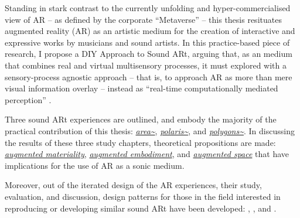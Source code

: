     \noindent Standing in stark contrast to the currently unfolding and hyper-commercialised view of AR --  as defined by the corporate ``Metaverse'' --  this thesis resituates augmented reality (AR) as an artistic medium for the creation of interactive and expressive works by musicians and sound artists. In this practice-based piece of research, I propose a DIY Approach to Sound ARt, arguing that, as an medium that combines real and virtual multisensory processes, it must explored with a sensory-process agnostic approach -- that is, to approach AR as more than mere visual information overlay -- instead as ``real-time computationally mediated perception'' \citep{chevalier2020}.
    
    \noindent Three sound ARt experiences are outlined, and embody the majority of the practical contribution of this thesis: \textit{\hyperref[sec: area]{area\textasciitilde{}}}, \textit{\hyperref[sec: polaris]{polaris\textasciitilde{}}}, and \textit{\hyperref[sec: polygons]{polygons\textasciitilde{}}}. In discussing the results of these three study chapters, theoretical propositions are made: \textit{\hyperref[sec: discussion-medium-material]{augmented materiality}}, \textit{\hyperref[sec: discussion-medium-embodiment]{augmented embodiment}}, and \textit{\hyperref[sec: discussion-medium-space]{augmented space}} that have implications for the use of AR as a sonic medium.
    
    \noindent Moreover, out of the iterated design of the AR experiences, their study, evaluation, and discussion, design patterns for those in the field interested in reproducing or developing similar sound ARt have been developed: \textit{}, \textit{}, and \textit{}. 